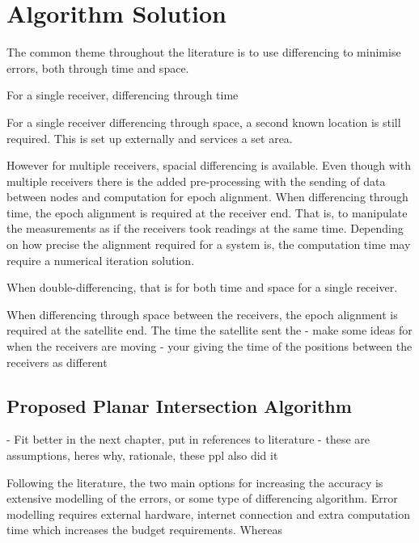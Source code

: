 
\def\chapdir{./ChapterPerception}

\chapter{Algorithm Solution}\label{ch:perception}

The common theme throughout the literature is to use differencing to minimise errors, both through time and space.

For a single receiver, differencing through time 

For a single receiver differencing through space, a second known location is still required. This is set up externally and services a set area.

However for multiple receivers, spacial differencing is available. Even though with multiple receivers there is the added pre-processing with the sending of data between nodes and computation for epoch alignment. When differencing through time, the epoch alignment is required at the receiver end. That is, to manipulate the measurements as if the receivers took readings at the same time. Depending on how precise the alignment required for a system is, the computation time may require a numerical iteration solution.

When double-differencing, that is for both time and space for a single receiver.

When differencing through space between the receivers, the epoch alignment is required at the satellite end. The time the satellite sent the 
- make some ideas for when the receivers are moving - your giving the time of the positions between the receivers as different 



\section{Proposed Planar Intersection Algorithm}
- Fit better in the next chapter, put in references to literature
- these are assumptions, heres why, rationale, these ppl also did it

Following the literature, the two main options for increasing the accuracy is extensive modelling of the errors, or some type of differencing algorithm. Error modelling requires external hardware, internet connection and extra computation time which increases the budget requirements. Whereas 


